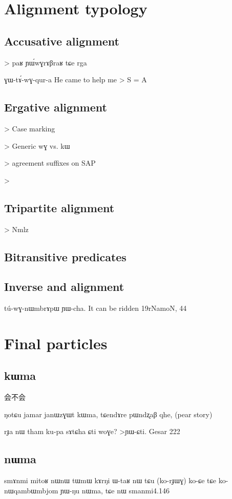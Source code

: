 \documentclass[oldfontcommands,oneside,a4paper,11pt]{memoir}
\newcommand{\wav}[1]{}%
\begin{document}
\chapter{Alignment typology}

\section{Accusative alignment}

> paʁ ɲɯ́wɣrɤβraʁ tɕe rga

ɣɯ-tɤ́-wɣ-qur-a 
He came to help me > S = A \wav{8_GWtAwGqura}
\section{Ergative alignment}
> Case marking

> Generic wɣ vs. kɯ

> agreement suffixes on SAP

> 


\section{Tripartite alignment}
> Nmlz
\section{Bitransitive predicates} \label{sec:bitransitive}


\section{Inverse and alignment}  

tú-wɣ-nɯmbrɤpɯ ɲɯ-cha.
It can be ridden
19rNamoN, 44
\chapter{Final particles}


\section{kɯma}
会不会


ŋotɕu jamar janɯzɣɯt kɯma, tɕendɤre pɯndʐaβ qhe, (pear story)


rɟa	nɯ	tham	ku-pa	sɤtɕha	ɕti	woɣe?
>ɲɯ-ɕti.
Gesar 222

\section{nɯma}
smɤnmi mitoʁ nɯnɯ tɯmɯ kɤrŋi ɯ-taʁ nɯ tɕu (ko-rɟɯɣ) ko-ɕe
tɕe ko-nɯqambɯmbjom ɲɯ-ŋu nɯma, tɕe nɯ 
smanmi4.146
\end{document}
